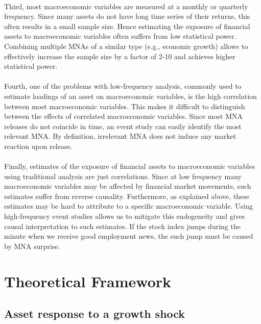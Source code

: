 \documentclass[12pt]{article}
\begin{document}
\paragraph{}
Third, most macroeconomic variables are measured at a monthly or quarterly frequency. Since many assets do not have long time series of their returns, this often results in a small sample size. Hence estimating the exposure of financial assets to macroeconomic variables often suffers from low statistical power. Combining multiple MNAs of a similar type (e.g., economic growth) allows to effectively increase the sample size by a factor of 2-10 and achieves higher statistical power. 
\paragraph{}
Fourth, one of the problems with low-frequency analysis, commonly used to estimate loadings of an asset on macroeconomic variables, is the high correlation between most macroeconomic variables. This makes it difficult to distinguish between the effects of correlated macroeconomic variables. Since most MNA releases do not coincide in time, an event study can easily identify the most relevant MNA. By definition, irrelevant MNA does not induce any market reaction upon release.
\paragraph{}
Finally, estimates of the exposure of financial assets to macroeconomic variables using traditional analysis are just correlations. Since at low frequency many macroeconomic variables may be affected by financial market movements, such estimates suffer from reverse causality. Furthermore, as explained above, these estimates may be hard to attribute to a specific macroeconomic variable. Using high-frequency event studies allows us to mitigate this endogeneity and gives causal interpretation to such estimates. If the stock index jumps during the minute when we receive good employment news, the such jump must be caused by MNA surprise.


\section{Theoretical Framework}

\subsection{Asset response to a growth shock}
\end{document}
